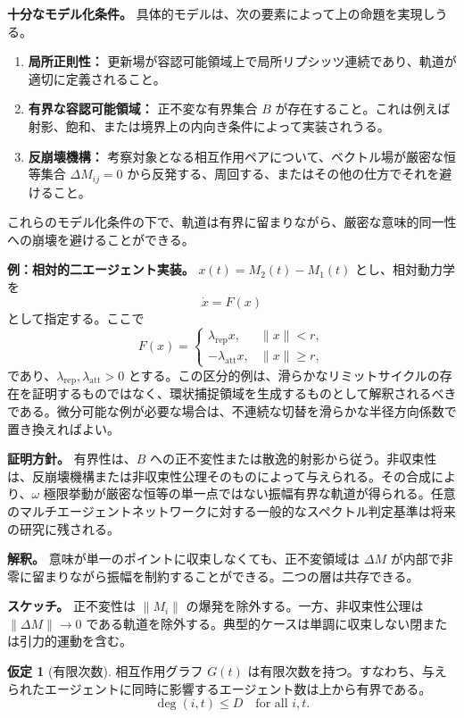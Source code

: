 \documentclass[11pt,a4paper]{article}
\theoremstyle{definition}
\newtheorem{assumption}{仮定}[section]
\begin{document}
\textbf{十分なモデル化条件。}
具体的モデルは、次の要素によって上の命題を実現しうる。
\begin{enumerate}
\item[(SC1)] \textbf{局所正則性：} 更新場が容認可能領域上で局所リプシッツ連続であり、軌道が適切に定義されること。
\item[(SC2)] \textbf{有界な容認可能領域：} 正不変な有界集合 $B$ が存在すること。これは例えば射影、飽和、または境界上の内向き条件によって実装されうる。
\item[(SC3)] \textbf{反崩壊機構：} 考察対象となる相互作用ペアについて、ベクトル場が厳密な恒等集合 $\Delta M_{ij}=0$ から反発する、周回する、またはその他の仕方でそれを避けること。
\end{enumerate}
これらのモデル化条件の下で、軌道は有界に留まりながら、厳密な意味的同一性への崩壊を避けることができる。

\textbf{例：相対的二エージェント実装。}
$x(t)=M_2(t)-M_1(t)$ とし、相対動力学を
\[
\dot{x}=F(x)
\]
として指定する。ここで
\[
F(x)=
\begin{cases}
\lambda_{\mathrm{rep}}x, & \|x\|<r,\\
-\lambda_{\mathrm{att}}x, & \|x\|\geq r,
\end{cases}
\]
であり、$\lambda_{\mathrm{rep}},\lambda_{\mathrm{att}}>0$ とする。この区分的例は、滑らかなリミットサイクルの存在を証明するものではなく、環状捕捉領域を生成するものとして解釈されるべきである。微分可能な例が必要な場合は、不連続な切替を滑らかな半径方向係数で置き換えればよい。

\textbf{証明方針。}
有界性は、$B$ への正不変性または散逸的射影から従う。非収束性は、反崩壊機構または非収束性公理そのものによって与えられる。その合成により、$\omega$ 極限挙動が厳密な恒等の単一点ではない振幅有界な軌道が得られる。任意のマルチエージェントネットワークに対する一般的なスペクトル判定基準は将来の研究に残される。

\textbf{解釈。} 意味が単一のポイントに収束しなくても、正不変領域は $\Delta M$ が内部で非零に留まりながら振幅を制約することができる。二つの層は共存できる。

\textbf{スケッチ。} 正不変性は $\|M_i\|$ の爆発を除外する。一方、非収束性公理は $\|\Delta M\| \to 0$ である軌道を除外する。典型的ケースは単調に収束しない閉または引力的運動を含む。

\begin{assumption}[有限次数]
相互作用グラフ $G(t)$ は有限次数を持つ。すなわち、与えられたエージェントに同時に影響するエージェント数は上から有界である。
\[
\deg(i,t) \leq D \quad \text{for all } i, t.
\]
\end{assumption}
\end{document}
